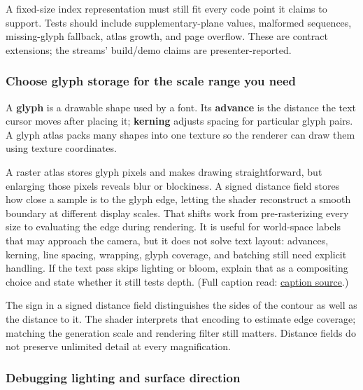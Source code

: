 A fixed-size index representation must still fit every code point it claims to support. Tests should include supplementary-plane values, malformed sequences, missing-glyph fallback, atlas growth, and page overflow. These are contract extensions; the streams' build/demo claims are presenter-reported.

\subsubsection{Choose glyph storage for the scale range you need}\label{06-engine-ii-ch026-choose-glyph-storage-for-the-scale-range-you-need}

\hypertarget{06-engine-ii-ch026-choose-glyph-storage-for-the-scale-range-you-need}{}

A \textbf{glyph} is a drawable shape used by a font. Its \textbf{advance} is the distance the text cursor moves after placing it; \textbf{kerning} adjusts spacing for particular glyph pairs. A glyph atlas packs many shapes into one texture so the renderer can draw them using texture coordinates.

A raster atlas stores glyph pixels and makes drawing straightforward, but enlarging those pixels reveals blur or blockiness. A signed distance field stores how close a sample is to the glyph edge, letting the shader reconstruct a smooth boundary at different display scales. That shifts work from pre-rasterizing every size to evaluating the edge during rendering. It is useful for world-space labels that may approach the camera, but it does not solve text layout: advances, kerning, line spacing, wrapping, glyph coverage, and batching still need explicit handling. If the text pass skips lighting or bloom, explain that as a compositing choice and state whether it still tests depth. (Full caption read: \href{https://www.youtube.com/watch?v=od_aKE_m38Y}{caption source}.)

The sign in a signed distance field distinguishes the sides of the contour as well as the distance to it. The shader interprets that encoding to estimate edge coverage; matching the generation scale and rendering filter still matters. Distance fields do not preserve unlimited detail at every magnification.

\subsubsection{Debugging lighting and surface direction}\label{06-engine-ii-ch026-debugging-lighting-and-surface-direction}

